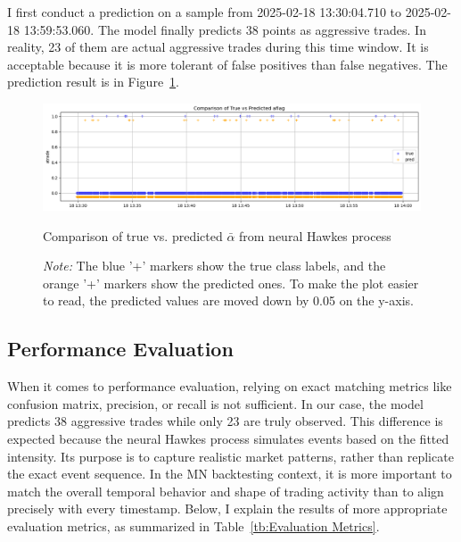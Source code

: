 I first conduct a prediction on a sample from 2025-02-18 13:30:04.710 to 2025-02-18 13:59:53.060. The model finally predicts 38 points as aggressive trades. In reality, 23 of them are actual aggressive trades during this time window. It is acceptable because it is more tolerant of false positives than false negatives. The prediction result is in Figure~\ref{fig:nhp-aflag}.

\begin{figure}[tbp]
    \centering
    \includegraphics[width=0.9\linewidth]{figures/aflag_NHP_181330.png}
    \caption{Comparison of true vs. predicted $\bar{\alpha}$ from neural Hawkes process} 
    \caption*{\textit{Note:} The blue '+' markers show the true class labels, and the orange '+' markers show the predicted ones. To make the plot easier to read, the predicted values are moved down by 0.05 on the y-axis.
    }
    \label{fig:nhp-aflag}
\end{figure}



\subsection{Performance Evaluation}
When it comes to performance evaluation, relying on exact matching metrics like confusion matrix, precision, or recall is not sufficient. In our case, the model predicts 38 aggressive trades while only 23 are truly observed. This difference is expected because the neural Hawkes process simulates events based on the fitted intensity. Its purpose is to capture realistic market patterns, rather than replicate the exact event sequence. In the MN backtesting context, it is more important to match the overall temporal behavior and shape of trading activity than to align precisely with every timestamp. Below, I explain the results of more appropriate evaluation metrics, as summarized in Table~\ref{tb:Evaluation Metrics}.

